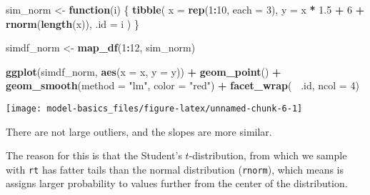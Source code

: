 \documentclass[]{book}
\newenvironment{Shaded}{\begin{snugshade}}{\end{snugshade}}
\newcommand{\ControlFlowTok}[1]{\textcolor[rgb]{0.13,0.29,0.53}{\textbf{#1}}}
\newcommand{\DataTypeTok}[1]{\textcolor[rgb]{0.13,0.29,0.53}{#1}}
\newcommand{\DecValTok}[1]{\textcolor[rgb]{0.00,0.00,0.81}{#1}}
\newcommand{\FloatTok}[1]{\textcolor[rgb]{0.00,0.00,0.81}{#1}}
\newcommand{\KeywordTok}[1]{\textcolor[rgb]{0.13,0.29,0.53}{\textbf{#1}}}
\newcommand{\NormalTok}[1]{#1}
\newcommand{\OperatorTok}[1]{\textcolor[rgb]{0.81,0.36,0.00}{\textbf{#1}}}
\newcommand{\StringTok}[1]{\textcolor[rgb]{0.31,0.60,0.02}{#1}}
\theoremstyle{definition}
\theoremstyle{definition}
\theoremstyle{definition}
\theoremstyle{remark}
\begin{document}
\begin{Shaded}
\begin{Highlighting}[]
\NormalTok{sim_norm <-}\StringTok{ }\ControlFlowTok{function}\NormalTok{(i) \{}
  \KeywordTok{tibble}\NormalTok{(}
    \DataTypeTok{x =} \KeywordTok{rep}\NormalTok{(}\DecValTok{1}\OperatorTok{:}\DecValTok{10}\NormalTok{, }\DataTypeTok{each =} \DecValTok{3}\NormalTok{),}
    \DataTypeTok{y =}\NormalTok{ x }\OperatorTok{*}\StringTok{ }\FloatTok{1.5} \OperatorTok{+}\StringTok{ }\DecValTok{6} \OperatorTok{+}\StringTok{ }\KeywordTok{rnorm}\NormalTok{(}\KeywordTok{length}\NormalTok{(x)),}
    \DataTypeTok{.id =}\NormalTok{ i}
\NormalTok{  )}
\NormalTok{\}}

\NormalTok{simdf_norm <-}\StringTok{ }\KeywordTok{map_df}\NormalTok{(}\DecValTok{1}\OperatorTok{:}\DecValTok{12}\NormalTok{, sim_norm)}

\KeywordTok{ggplot}\NormalTok{(simdf_norm, }\KeywordTok{aes}\NormalTok{(}\DataTypeTok{x =}\NormalTok{ x, }\DataTypeTok{y =}\NormalTok{ y)) }\OperatorTok{+}
\StringTok{  }\KeywordTok{geom_point}\NormalTok{() }\OperatorTok{+}
\StringTok{  }\KeywordTok{geom_smooth}\NormalTok{(}\DataTypeTok{method =} \StringTok{"lm"}\NormalTok{, }\DataTypeTok{color =} \StringTok{"red"}\NormalTok{) }\OperatorTok{+}
\StringTok{  }\KeywordTok{facet_wrap}\NormalTok{(}\OperatorTok{~}\StringTok{ }\NormalTok{.id, }\DataTypeTok{ncol =} \DecValTok{4}\NormalTok{)}
\end{Highlighting}
\end{Shaded}

\begin{center}\texttt{[image: model-basics\_files/figure-latex/unnamed-chunk-6-1]} \end{center}

There are not large outliers, and the slopes are more similar.

The reason for this is that the Student's \(t\)-distribution, from which
we sample with \texttt{rt} has fatter tails than the normal distribution
(\texttt{rnorm}), which means is assigns larger probability to values
further from the center of the distribution.

\begin{Shaded}
\end{Shaded}
\end{document}

